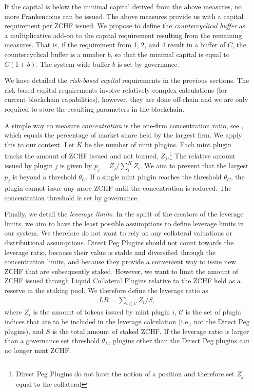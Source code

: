\documentclass[english,11pt]{article}
\begin{document}
If the capital is below the minimal capital derived from the above measures,
no more Frankencoins can be issued.
The above measures provide us with a capital requirement per ZCHF issued.
We propose to define the \emph{countercyclical buffer} as a multiplicative add-on to the
capital requirement resulting from the remaining measures. That is,
if the requirement from 1, 2, and 4 result in a buffer of $C$, the
countercyclical buffer is a number $b$, so that the minimal capital is equal
to $C(1+b)$. The system-wide buffer $b$ is set by governance.

We have detailed the \emph{risk-based capital} requirements in the previous sections.
The risk-based capital requirements involve relatively complex calculations
(for current blockchain capabilities), however, they are done off-chain and we are only required to store the resulting
parameters in the blockchain.

A simple way to measure \emph{concentration} is the one-firm concentration ratio,
see \cite{curry1983industrial}, which equals the percentage of market share held by the largest firm. We apply this to our context. Let $K$ be the number of mint plugins. Each mint plugin tracks the amount of ZCHF issued and not burned, $Z_j$.\footnote{Direct Peg Plugins
do not have the notion of a position and therefore set $Z_j$ equal to the
collateral}
The relative amount issued by plugin $j$ is given by $p_j=Z_j/\sum_i^K Z_i$. We aim to prevent that the largest
$p_j$ is beyond a threshold $\theta_C$. If a single mint plugin reaches the threshold 
$\theta_C$,
the plugin cannot issue any more ZCHF until the concentration is reduced. The
concentration threshold is set by governance.

Finally, we detail the \emph{leverage limits}. In the spirit of the
creators of the leverage limits, we aim to have the least possible assumptions
to define leverage limits in our system. We therefore do not want to rely on any 
collateral valuations or distributional assumptions.
Direct Peg Plugins should not count towards the leverage ratio,
because their value is stable and diversified through the concentration limits,
and because they provide a convenient way to issue new 
ZCHF that are subsequently staked. However, we want to limit the
amount of ZCHF issued through Liquid Collateral Plugins relative to the ZCHF
held as a reserve in the staking pool. We therefore define the leverage ratio
as
\begin{align}
LR = \sum_{i \in \mathcal{C}} Z_i/S,
\end{align}
where $Z_i$ is the amount of tokens issued by mint plugin $i$, $\mathcal{C}$
is the set of plugin indices that are to be included in the leverage
calculation (i.e., not the Direct Peg plugins), and $S$ is the total amount
of staked ZCHF. If the leverage ratio is larger than a governance set threshold $\theta_L$,
plugins other than the Direct Peg plugins can no longer mint ZCHF.
\end{document}
